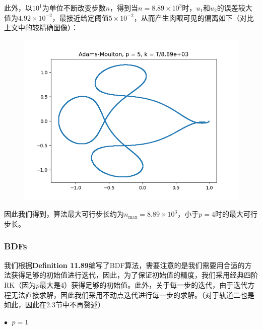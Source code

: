 \documentclass{ctexart}
\begin{document}
\begin{sloppypar}
此外，以$10^1$为单位不断改变步数$n$，得到当$n = 8.89 \times 10^3$时，$u_1$和$u_2$的误差较大值为$4.92 \times 10^{-2}$，最接近给定阈值$5 \times 10^{-2}$，从而产生肉眼可见的偏离如下（对比上文中的较精确图像）：
\begin{figure}[H]
\centering
\includegraphics[scale = 0.45]{./report_src/Figure_16.png}
\end{figure}
因此我们得到，算法最大可行步长约为$n_{\max} = 8.89 \times 10^3$，小于$p=4$时的最大可行步长。

\subsubsection{BDFs}
我们根据\textbf{Definition 11.89}编写了BDF算法，需要注意的是我们需要用合适的方法获得足够的初始值进行迭代，因此，为了保证初始值的精度，我们采用经典四阶RK（因为$p$最大是4）获得足够的初始值。此外，关于每一步的迭代，由于迭代方程无法直接求解，因此我们采用不动点迭代进行每一步的求解。（对于轨道二也是如此，因此在2.3节中不再赘述）

$\bullet \;$ $p = 1$


\end{sloppypar}
\end{document}
